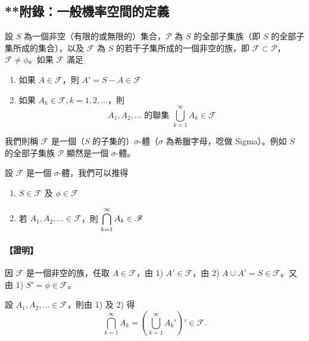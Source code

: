\vspace{2em}
\subsection*{**附錄：一般機率空間的定義}\label{sec:b5s-ch4-appendix}

設 $S$ 為一個非空（有限的或無限的）集合，$\mathscr{P}$ 為 $S$ 的全部子集族（即 $S$ 的全部子集所成的集合），以及 $\mathscr{F}$ 為 $S$ 的若干子集所成的一個非空的族，即 $\mathscr{F} \subset \mathscr{P}$，$\mathscr{F} \neq \phi$。如果 $\mathscr{F}$ 滿足
\begin{enumerate}[label=\arabic*)]
  \item 如果 $A \in \mathscr{F}$，則 $A' = S - A \in \mathscr{F}$
  \item 如果 $A_k \in \mathscr{F}, k = 1, 2, \dots$，則
  \[
  A_1, A_2, \dots \text{ 的聯集 } \bigcup_{k=1}^\infty A_k \in \mathscr{F}
  \]
\end{enumerate}
我們則稱 $\mathscr{F}$ 是一個（$S$ 的子集的）$\sigma$-體（$\sigma$ 為希臘字母，唸做 Sigma）。例如 $S$ 的全部子集族 $\mathscr{P}$ 顯然是一個 $\sigma$-體。

設 $\mathscr{F}$ 是一個 $\sigma$-體，我們可以推得
\begin{enumerate}[label=\roman*)]
  \item $S \in \mathscr{F}$ 及 $\phi \in \mathscr{F}$
  \item 若 $A_1, A_2, \dots \in \mathscr{F}$，則 $\displaystyle\bigcap_{k=1}^\infty A_k \in \mathscr{F}$
\end{enumerate}
\paragraph{【證明】}
因 $\mathscr{F}$ 是一個非空的族，任取 $A \in \mathscr{F}$，由 1) $A' \in \mathscr{F}$，由 2) $A \cup A' = S \in \mathscr{F}$。又由 1) $S' = \phi \in \mathscr{F}$。

設 $A_1, A_2, \dots \in \mathscr{F}$，則由 1) 及 2) 得
\[
\bigcap_{k=1}^\infty A_k = \left( \bigcup_{k=1}^\infty A_k' \right)' \in \mathscr{F}. \tag*{\#}
\]

